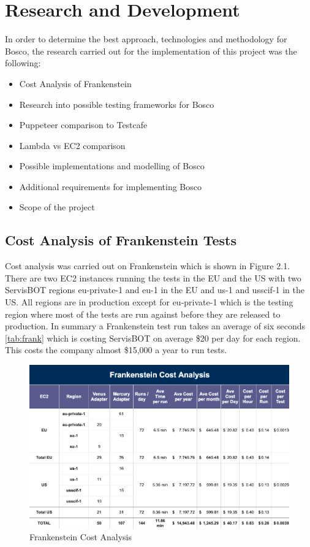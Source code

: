 \documentclass[12pt,a4paper,titlepage]{report}
\begin{document}
\chapter{Research and Development}

In order to determine the best approach, technologies and methodology for Bosco, the research carried out for the implementation of this project was the following:

\begin{itemize}
 \item Cost Analysis of Frankenstein
 \item Research into possible testing frameworks for Bosco
 \item Puppeteer comparison to Testcafe
 \item Lambda vs EC2 comparison
 \item Possible implementations and modelling of Bosco
 \item Additional requirements for implementing Bosco
 \item Scope of the project
\end{itemize}

\section{Cost Analysis of Frankenstein Tests}

Cost analysis was carried out on Frankenstein which is shown in Figure 2.1. There are two EC2 instances running the tests in the EU and the US with two ServisBOT regions eu-private-1 and eu-1 in the EU and us-1 and usscif-1 in the US. 
All regions are in production except for eu-private-1 which is the testing region where most of the tests are run against before they are released to production. 
In summary a Frankenstein test run takes an average of six seconds \ref{tab:frank} which is costing ServisBOT on average \$20 per day for each region. 
This costs the company almost \$15,000 a year to run tests.

\begin{figure}[ht]
 \centering
 \includegraphics[width=\textwidth,height=\textheight,keepaspectratio]{./diagrams/frank_cost_analysis.png}
 \caption{Frankenstein Cost Analysis}
\end{figure}
\end{document}
